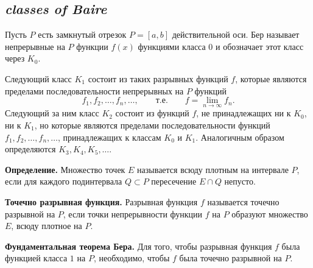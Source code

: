\subsection*{ \textit{classes of Baire}}
\begin{rusblock}
Пусть $P$ есть замкнутый отрезок $P=[a,b]$ действительной оси. Бер называет непрерывные на $P$ функции $f(x)$ функциями класса $0$ и обозначает этот класс через $K_0$.

Следующий класс $K_1$ состоит из таких разрывных функций $f$, которые являются пределами последовательности непрерывных на $P$ функций
\[
f_1,f_2,\ldots,f_n,\ldots,\qquad\text{т.е.}\qquad f=\lim_{n\to\infty}f_n.
\]
Следующий за ним класс $K_2$ состоит из функций $f$, не принадлежащих ни к $K_0$, ни к $K_1$, но которые являются пределами последовательности функций $f_1,f_2,\ldots,f_n,\ldots$, принадлежащих к классам $K_0$ и $K_1$. Аналогичным образом определяются $K_3,K_4,K_5,\ldots$.

\textbf{Определение.} Множество точек $E$ называется всюду плотным на интервале $P$, если для каждого подинтервала $Q\subset P$ пересечение $E\cap Q$ непусто.

\textbf{Точечно разрывная функция.} Разрывная функция $f$ называется точечно разрывной на $P$, если точки непрерывности функции $f$ на $P$ образуют множество $E$, всюду плотное на $P$.

\textbf{Фундаментальная теорема Бера.} Для того, чтобы разрывная функция $f$ была функцией класса $1$ на $P$, необходимо, чтобы $f$ была точечно разрывной на $P$.
\end{rusblock}

